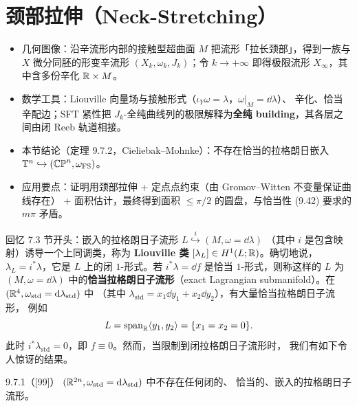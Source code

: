 \section{颈部拉伸（Neck-Stretching）}

\begin{keytakeaways}
\begin{itemize}
  \item 几何图像：沿辛流形内部的接触型超曲面 $M$ 把流形「拉长颈部」，得到一族与 $X$
        微分同胚的形变辛流形 $(X_k,\omega_k,J_k)$；令 $k\to+\infty$ 即得极限流形
        $X_\infty$，其中含多份辛化 $\mathbb{R}\times M$。
  \item 数学工具：Liouville 向量场与接触形式（$\iota_Y\omega=\lambda$，$\omega|_M=\dd\lambda$）、
        辛化、恰当辛配边；SFT 紧性把 $J_k$-全纯曲线列的极限解释为\textbf{全纯
        building}，其各层之间由闭 Reeb 轨道相接。
  \item 本节结论（定理 9.7.2，Cieliebak–Mohnke）：不存在恰当的拉格朗日嵌入
        $\mathbb{T}^n\hookrightarrow(\mathbb{CP}^n,\omega_{\mathrm{FS}})$。
  \item 应用要点：证明用颈部拉伸 + 定点点约束（由 Gromov–Witten 不变量保证曲线存在）
        + 面积估计，最终得到面积 $\leqslant\pi/2$ 的圆盘，与恰当性 (9.42) 要求的
        $m\pi$ 矛盾。
\end{itemize}
\end{keytakeaways}

回忆 7.3 节开头：嵌入的拉格朗日子流形 $L\overset{i}{\hookrightarrow}(M,\omega=\dd\lambda)$
（其中 $i$ 是包含映射）诱导一个上同调类，称为 \textbf{Liouville 类}
$[\lambda_L]\in H^1(L;\mathbb{R})$。确切地说，$\lambda_L=i^*\lambda$，它是 $L$ 上的闭
$1$-形式。若 $i^*\lambda=\dd f$ 是恰当 $1$-形式，则称这样的 $L$ 为
$(M,\omega=\dd\lambda)$ 中的\textbf{恰当拉格朗日子流形}（exact Lagrangian
submanifold）。在 $(\mathbb{R}^4,\omega_{\mathrm{std}}=\mathrm{d}\lambda_{\mathrm{std}})$ 中
（其中 $\lambda_{\mathrm{std}}=x_1\dd y_1+x_2\dd y_2$），有大量恰当拉格朗日子流形，
例如
\[
L=\mathrm{span}_{\mathbb{R}}\langle y_1,y_2\rangle=\{x_1=x_2=0\}.
\]
此时 $i^*\lambda_{\mathrm{std}}=0$，即 $f\equiv0$。然而，当限制到闭拉格朗日子流形时，
我们有如下令人惊讶的结果。

\begin{wthm}{9.7.1}（[99]）
$(\mathbb{R}^{2n},\omega_{\mathrm{std}}=\mathrm{d}\lambda_{\mathrm{std}})$ 中不存在任何闭的、
恰当的、嵌入的拉格朗日子流形。
\end{wthm}

